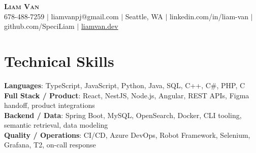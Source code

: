 \documentclass[letterpaper,11pt]{article}
\begin{document}

%
\begin{center}
    \textbf{\Huge \scshape Liam Van} \\ \vspace{1pt}
    \small 678-488-7259 $|$ \small {liamvanpj@gmail.com} $|$ Seattle, WA
 {{$|$ linkedin.com/in/liam-van} {$|$ github.com/SpeciLiam} {$|$ \href{https://liamvan.dev}{liamvan.dev}}}

\end{center}

\section{Technical Skills}
 \begin{itemize}[leftmargin=0.15in, label={}]
    \small{\item{
     \textbf{Languages}{: TypeScript, JavaScript, Python, Java, SQL, C++, C\#, PHP, C} \\
     \textbf{Full Stack / Product}{: React, NestJS, Node.js, Angular, REST APIs, Figma handoff, product integrations} \\
     \textbf{Backend / Data}{: Spring Boot, MySQL, OpenSearch, Docker, CLI tooling, semantic retrieval, data modeling} \\
     \textbf{Quality / Operations}{: CI/CD, Azure DevOps, Robot Framework, Selenium, Grafana, T2, on-call response} \\
    }}
 \end{itemize}
%

\end{document}

